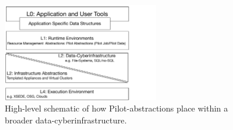 \documentclass[times]{cpeauth}
\newcommand{\jhanote}[1]{ {\textcolor{red} { ***shantenu: #1 }}}
\newcommand{\pmnote}[1]{ {\textcolor{blue} { ***Pradeep: #1 }}}
\newcommand{\note}[1]{ {\textcolor{magenta} { ***Note: #1 }}}
\newcommand{\pmnote}[1]{}
\newcommand{\jhanote}[1]{}
\newcommand{\note}[1]{}
\begin{document}








\begin{figure}[t] \centering
\includegraphics[width=0.6\textwidth]{figures/data-intensive-arch.pdf}
\caption{High-level schematic of how Pilot-abstractions place within a
  broader data-cyberinfrastructure. }
\label{fig:figures_arch}
\end{figure}
\end{document}
